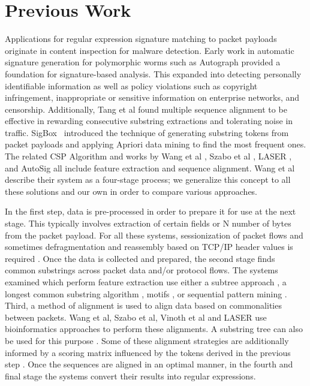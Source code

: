\section{Previous Work}

Applications for regular expression signature matching to packet payloads originate in content inspection for malware detection. Early work in automatic signature generation for polymorphic worms such as Autograph \cite{KimHyangAh} provided a foundation for signature-based analysis. This expanded into detecting personally identifiable information as well as policy violations such as copyright infringement, inappropriate or sensitive information on enterprise networks, and censorship. Additionally, Tang et al \cite{TANG2009827} found multiple sequence alignment to be effective in rewarding consecutive substring extractions and tolerating noise in traffic. SigBox~\cite{sigbox} introduced the technique of generating substring tokens from packet payloads and applying Apriori data mining to find the most frequent ones. The related CSP Algorithm \cite{Sija} and works by Wang et al \cite{WANG2012992}, Szabo et al \cite{Szabo}, LASER \cite{LASER}, and AutoSig \cite{AutoSig} all include feature extraction and sequence alignment. Wang et al describe their system as a four-stage process; we generalize this concept to all these solutions and our own in order to compare various approaches.

In the first step, data is pre-processed in order to prepare it for use at the next stage. This typically involves extraction of certain fields or N number of bytes from the packet payload. For all these systems, sessionization of packet flows and sometimes defragmentation and reassembly based on TCP/IP header values is required \cite{sigbox, WANG2012992, Sija, Szabo, AutoSig, LASER}. Once the data is collected and prepared, the second stage finds common substrings across packet data and/or protocol flows. The systems examined which perform feature extraction use either a subtree approach \cite{WANG2012992}, a longest common substring algorithm \cite{AutoSig, LASER}, motifs \cite{Szabo}, or sequential pattern mining \cite{sigbox, Sija}. Third, a method of alignment is used to align data based on commonalities between packets. Wang et al, Szabo et al, Vinoth et al \cite{VinothGeorge2013EfficientRE} and LASER use bioinformatics approaches to perform these alignments. A substring tree can also be used for this purpose \cite{AutoSig}. Some of these alignment strategies are additionally informed by a scoring matrix influenced by the tokens derived in the previous step \cite{WANG2012992, Szabo, LASER}. Once the sequences are aligned in an optimal manner, in the fourth and final stage the systems convert their results into regular expressions.
